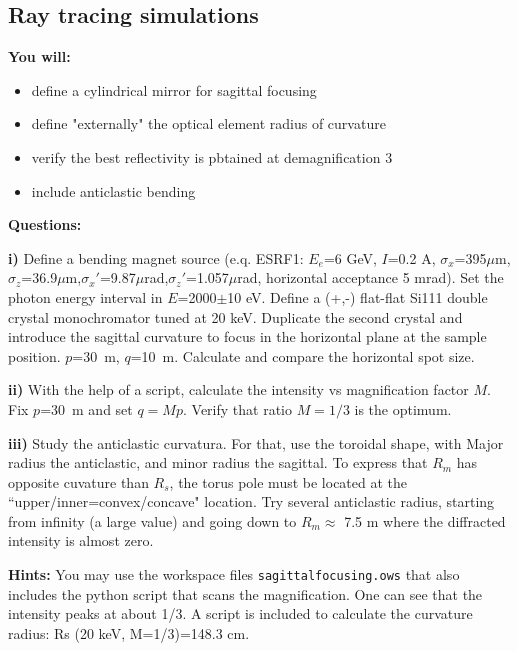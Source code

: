 \subsection{Ray tracing simulations}

\begin{youwillbox}
\textbf{You will:}

\begin{itemize}
    \item define a cylindrical mirror for sagittal focusing
    \item define "externally" the optical element radius of curvature
    \item verify the best reflectivity is pbtained at demagnification 3
    \item include anticlastic bending
\end{itemize}
\end{youwillbox}

\begin{questionsbox}
\textbf{Questions:}

\textbf{i)} Define a bending magnet source (e.q. ESRF1: $E_e$=6 GeV, $I$=0.2 A, $\sigma_x$=395$\mu$m, $\sigma_z$=36.9$\mu$m,$\sigma_x'$=9.87$\mu$rad,$\sigma_z'$=1.057$\mu$rad, horizontal acceptance 5 mrad). Set the photon energy interval in $E$=2000$\pm$10 eV. Define a (+,-) flat-flat Si111 double crystal monochromator tuned at 20 keV. Duplicate the second crystal and introduce the sagittal curvature to focus in the horizontal plane at the sample position. $p$=30~m, $q$=10~m. Calculate and compare the horizontal spot size.

\textbf{ii)} With the help of a script, calculate the intensity vs magnification factor $M$. Fix $p$=30~m and set $q=Mp$. Verify that ratio $M=1/3$ is the optimum.

\textbf{iii)} Study the anticlastic curvatura. For that, use the toroidal shape, with Major radius the anticlastic, and minor radius the sagittal. To express that $R_m$ has opposite cuvature than $R_s$, the torus pole must be located at the ``upper/inner=convex/concave" location. Try several anticlastic radius, starting from infinity (a large value) and going down to $R_m \approx$ 7.5 m where the diffracted intensity is almost zero.
\end{questionsbox}

\begin{hintsbox}
\textbf{Hints:} You may use the workspace files {\tt sagittalfocusing.ows} that also includes the python script that scans the magnification. One can see that the intensity peaks at about 1/3. A script is included to calculate the curvature radius: Rs (20 keV, M=1/3)=148.3 cm.
\end{hintsbox}

